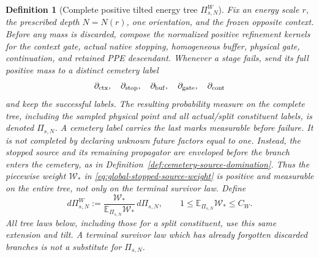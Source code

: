 \documentclass[11pt]{article}
\newtheorem{definition}[theorem]{Definition}
\begin{document}
\begin{definition}[Complete positive tilted energy tree
$\Pi_{s,N}^{W}$]
\label{def:complete-tilted-energy-tree}
Fix an energy scale $r$, the prescribed depth $N=N(r)$, one orientation,
and the frozen opposite context.  Before any mass is discarded, compose the
normalized positive refinement kernels for the context gate, actual native
stopping, homogeneous buffer, physical gate, continuation, and retained
PPE descendant.  Whenever a stage fails, send its full positive mass to a
distinct cemetery label
\[
 \partial_{\rm ctx},\quad\partial_{\rm stop},\quad
 \partial_{\rm buf},\quad\partial_{\rm gate},\quad
 \partial_{\rm cont}
\]
and keep the successful labels.  The resulting probability measure on the
complete tree, including the sampled physical point and all actual/split
constituent labels, is denoted $\Pi_{s,N}$.  A cemetery label carries the
last marks measurable before failure.  It is not completed by declaring
unknown future factors equal to one.  Instead, the stopped source and its
remaining propagator are enveloped before the branch enters the cemetery,
as in Definition~\ref{def:cemetery-source-domination}.  Thus the piecewise
weight $\mathscr W_*$ in \eqref{eq:global-stopped-source-weight} is positive
and measurable on the entire tree, not only on the terminal survivor law.
Define
\begin{equation}
\label{eq:complete-energy-tree-tilt}
 d\Pi_{s,N}^{W}:=
 \frac{\mathscr W_*}{\mathbb E_{\Pi_{s,N}}\mathscr W_*}\,d\Pi_{s,N},
 \qquad
 1\le\mathbb E_{\Pi_{s,N}}\mathscr W_*\le C_W .
\end{equation}
All tree laws below, including those for a split constituent, use this same
extension and tilt.  A terminal survivor law which has already forgotten
discarded branches is not a substitute for $\Pi_{s,N}$.
\end{definition}
\end{document}
